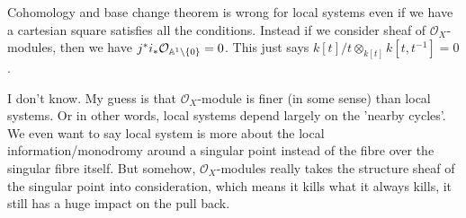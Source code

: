 \documentclass[../main.tex]{subfiles}
\begin{document}
\begin{remark}
Cohomology and base change theorem is wrong for local systems even if we have a cartesian square satisfies all the conditions. Instead if we consider sheaf of $\mathcal{O}_{X}$-modules, then we have $j^{*}i_{*}\mathcal{O}_{\mathbb{A}^{1}\setminus\{0\}}=0$. This just says $k[t]/t\otimes_{k[t]}k[t, t^{-1}]=0$.
\end{remark}
\begin{remark}
I don't know. My guess is that $\mathcal{O}_{X}$-module is finer (in some sense) than local systems. Or in other words, local systems depend largely on the 'nearby cycles'. We even want to say local system is more about the local information/monodromy around a singular point instead of the fibre over the singular fibre itself. But somehow, $\mathcal{O}_{X}$-modules really takes the structure sheaf of the singular point into consideration, which means it kills what it always kills, it still has a huge impact on the pull back. 
\end{remark}
\end{document}
